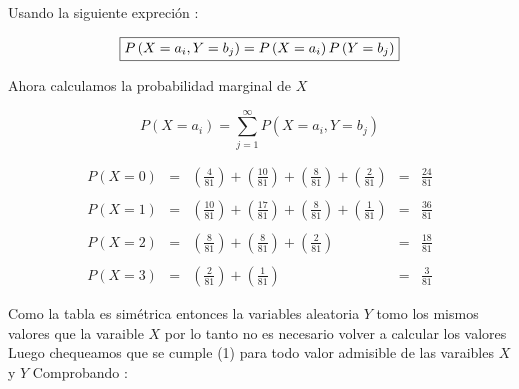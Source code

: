 \documentclass[12pt]{article}
\begin{document}
Usando la siguiente expreci\'on :


\begin{equation}
    \fbox{$
    \displaystyle P\left(X = a_i,Y = b_j\right)  =  P\left(X = a_i\right) P\left(Y = b_j\right)
    $}
\end{equation}

\begin{flushleft}
    Ahora calculamos la probabilidad marginal de $X$
\end{flushleft}

\begin{equation*}
    \displaystyle P\left(X = a_i\right)  =  \displaystyle \sum_{j=1}^{\infty} P \left(X = a_i,Y = b_j\right)
\end{equation*}

\begin{equation*}
    \begin{array}{rclcl}
        \displaystyle P\left(X = 0\right)   & = & \displaystyle \left( \frac{4}{81}\right) + \left(\frac{10}{81}\right) + \left(\frac{8}{81}\right) +\left( \frac{2}{81}\right)     & = &  \displaystyle \frac{24}{81}
        \\
        \\
        \displaystyle  P\left(X = 1\right)   & = & \displaystyle \left(\frac{10}{81}\right) + \left(\frac{17}{81}\right) + \left(\frac{8}{81}\right)  + \left(\frac{1}{81}\right)   & = & \displaystyle \frac{36}{81}
        \\
        \\
        \displaystyle P\left(X = 2\right)   & = & \displaystyle \left(\frac{8}{81}\right) + \left(\frac{8}{81}\right) + \left(\frac{2}{81}\right)                                           & = & \displaystyle \frac{18}{81}
        \\
        \\
        \displaystyle P\left(X = 3\right)   & = & \displaystyle  \left(\frac{2}{81}\right) + \left(\frac{1}{81}\right)                                                                 & = & \displaystyle \frac{3}{81}
    \end{array}
\end{equation*}

\begin{flushleft}

Como la tabla es sim\'etrica entonces la variables aleatoria $Y$ tomo los mismos valores que la varaible $X$
por lo tanto no es necesario volver a  calcular los valores 
Luego chequeamos que se cumple (1) para todo valor admisible de las varaibles $X$ y $Y$ Comprobando :  
\end{flushleft}
\end{document}
